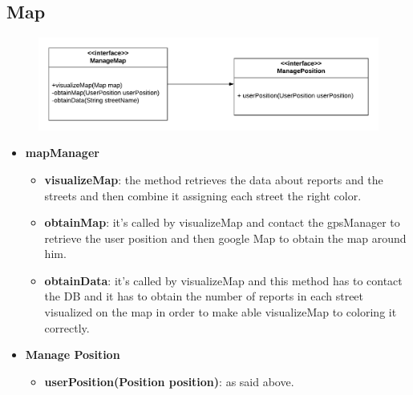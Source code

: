\documentclass[12pt,a4paper]{report}
\begin{document}
			\subsection{Map}
				\begin{figure}[H]
						\includegraphics[width = \textwidth, center]{mapInterface}
						\label{fig: interfaces}
				\end{figure}
				\begin{itemize}
						\item \textbf{mapManager}
						\begin{itemize}
							\item \textbf{visualizeMap}: the method retrieves the data about reports and the streets
								and then combine it assigning each street the right color. 
							\item \textbf{obtainMap}: it's called by visualizeMap and contact the gpsManager to
								retrieve the user position and then google Map to obtain the map around him.
							\item \textbf{obtainData}: it's called by visualizeMap and this method has to contact the DB
								and it has to obtain the number of reports in each street visualized on the map in
								order to make able visualizeMap to coloring it correctly.
						\end{itemize}
					\item \textbf{Manage Position}
					\begin{itemize}
						\item \textbf{userPosition(Position position)}: as said above.
					\end{itemize}
				\end{itemize}
\end{document}
